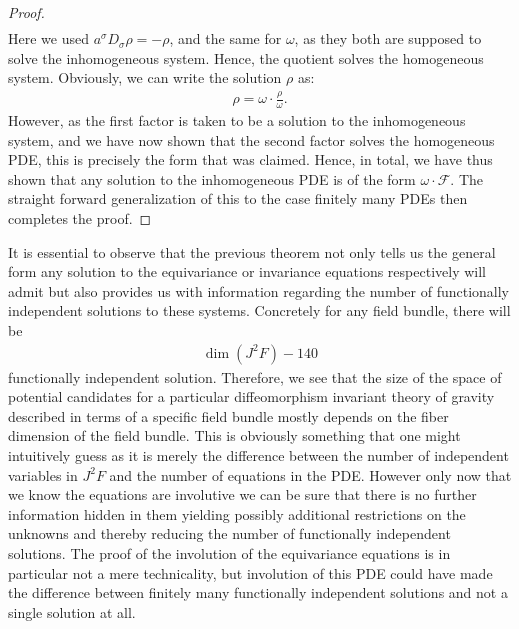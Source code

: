 \begin{proof}
\begin{align}
\end{align}
Here we used $a^{\sigma}D_{\sigma} \rho = -\rho$, and the same for $\omega$, as they both are supposed to solve the inhomogeneous system. Hence, the quotient solves the homogeneous system. Obviously, we can write the solution $\rho$ as: 
\begin{align}
    \rho = \omega \cdot  \frac{\rho}{\omega}.
\end{align}
However, as the first factor is taken to be a solution to the inhomogeneous system, and we have now shown that the second factor solves the homogeneous PDE, this is precisely the form that was claimed. 
Hence, in total, we have thus shown that any solution to the inhomogeneous PDE is of the form $\omega \cdot \mathcal{F}$.
The straight forward generalization of this to the case finitely many PDEs then completes the proof.
\end{proof}
It is essential to observe that the previous theorem not only tells us the general form any solution to the equivariance or invariance equations respectively will admit but also provides us with information regarding the number of functionally independent solutions to these systems. Concretely for any field bundle, there will be 
\begin{align}
    \operatorname{dim}(J^2F) - 140 
\end{align}
functionally independent solution.
Therefore, we see that the size of the space of potential candidates for a particular diffeomorphism invariant theory of gravity described in terms of a specific field bundle mostly depends on the fiber dimension of the field bundle. 
This is obviously something that one might intuitively guess as it is merely the difference between the number of independent variables in $J^2F$ and the number of equations in the PDE. However only now that we know the equations are involutive we can be sure that there is no further information hidden in them yielding possibly additional restrictions on the unknowns and thereby reducing the number of functionally independent solutions. 
The proof of the involution of the equivariance equations is in particular not a mere technicality, but involution of this PDE could have made the difference between finitely many functionally independent solutions and not a single solution at all. 

